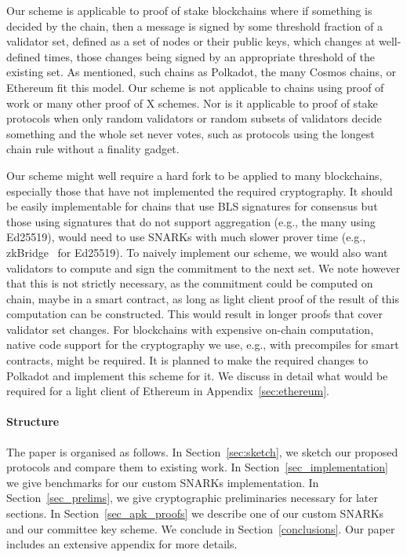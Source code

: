 \noindent Our scheme is applicable to proof of stake blockchains where if something is decided by the chain, then a message is signed by some threshold fraction of a validator set, defined as a set of nodes or their public keys, which changes at well-defined times, those changes being signed by an appropriate threshold of the existing set. As mentioned, such chains as Polkadot, the many Cosmos chains, or Ethereum fit this model. Our scheme is not applicable to chains using proof of work or many other proof of X schemes. Nor is it applicable to proof of stake protocols when only random validators or random subsets of validators decide something and the whole set never votes, such as protocols using the longest chain rule without a finality gadget.

\noindent Our scheme might well require a hard fork to be applied to many blockchains, especially those that have not implemented the required cryptography. It should be easily implementable for chains that use BLS signatures for consensus but those using signatures that do not support aggregation (e.g., the many using Ed25519), would need to use SNARKs with much slower prover time (e.g., zkBridge~\cite{zkBridge} for Ed25519). To naively implement our scheme, we would also want validators to compute and sign the commitment to the next set. We note however that this is not strictly necessary, as the commitment could be computed on chain, maybe in a smart contract, as long as light client proof of the result of this computation can be constructed. This would result in longer proofs that cover validator set changes. For blockchains with expensive on-chain computation, native code support for the cryptography we use, e.g., with precompiles for smart contracts, might be required. It is planned to make the required changes to Polkadot and implement this scheme for it. We discuss in detail what would be required for a light client of Ethereum in Appendix~\ref{sec:ethereum}.
\vspace{-0.1in}
\paragraph{Structure} The paper is organised as follows.
In Section~\ref{sec:sketch}, we sketch our proposed protocols and compare
them to existing work. In
Section~\ref{sec_implementation} we give benchmarks for our custom SNARKs
implementation.
In Section~\ref{sec_prelims}, we give cryptographic
preliminaries necessary for later sections. In Section~\ref{sec_apk_proofs}
we describe one of our custom SNARKs and our committee key scheme.
 We conclude in Section~\ref{conclusions}. {\color{red}Our paper includes
an extensive appendix for more details.}%
\vspace{-0.25cm}
